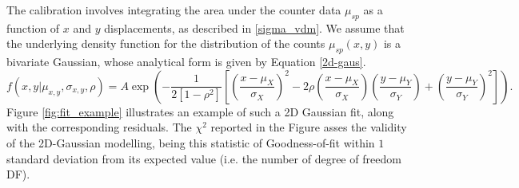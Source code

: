 The calibration involves integrating the area under the counter data $\mu_{sp}$ as a function of $x$ and $y$ displacements, as described in \eqref{sigma_vdm}. We assume that the underlying density function for the distribution of the counts $\mu_{sp}(x,y)$ is a bivariate Gaussian, whose analytical form is given by Equation \eqref{2d-gaus}. 
\begin{equation}
    f(x,y|\mu_{x,y},\sigma_{x,y},\rho)=A\exp{\left(-{\frac {1}{2\left[1-\rho ^{2}\right]}}\left[\left({\frac {x-\mu _{X}}{\sigma _{X}}}\right)^{2}-2\rho \left({\frac {x-\mu _{X}}{\sigma _{X}}}\right)\left({\frac {y-\mu _{Y}}{\sigma _{Y}}}\right)+\left({\frac {y-\mu _{Y}}{\sigma _{Y}}}\right)^{2}\right]\right)}\label{2d-gaus}.
\end{equation}
Figure \ref{fig:fit_example} illustrates an example of such a 2D Gaussian fit, along with the corresponding residuals. The $\chi^2$ reported in the Figure asses the validity of the 2D-Gaussian modelling, being this statistic of Goodness-of-fit within $1$ standard deviation from its expected value (i.e. the number of degree of freedom DF).


